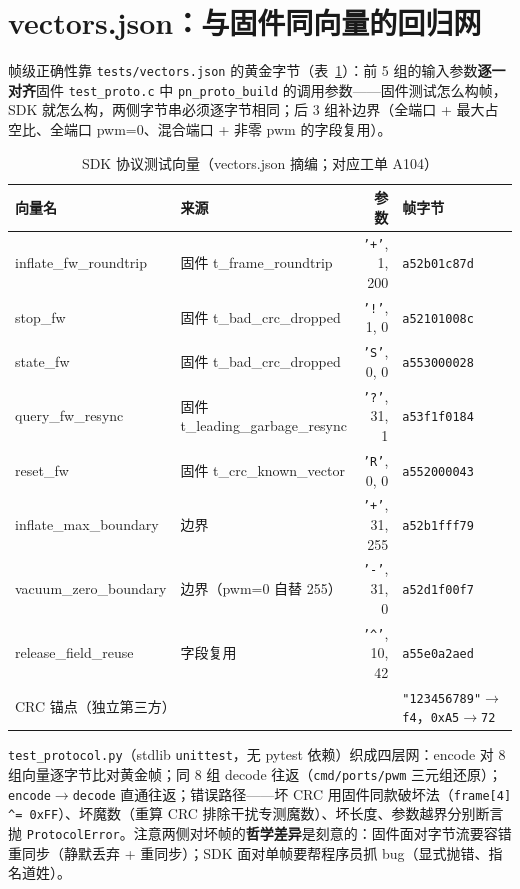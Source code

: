 \section{vectors.json：与固件同向量的回归网}
\label{sec:sdk-vectors}

帧级正确性靠 \texttt{tests/vectors.json} 的黄金字节（表~\ref{tab:sdk-vectors}）：前 5 组的输入参数\textbf{逐一对齐}固件 \texttt{test\_proto.c} 中 \texttt{pn\_proto\_build} 的调用参数——固件测试怎么构帧，SDK 就怎么构，两侧字节串必须逐字节相同；后 3 组补边界（全端口 + 最大占空比、全端口 pwm=0、混合端口 + 非零 pwm 的字段复用）。

\begin{table}[htbp]
  \centering
  \caption{SDK 协议测试向量（vectors.json 摘编；对应工单 A104）}
  \label{tab:sdk-vectors}
  \begin{tabular}{llrl}
    \toprule
    向量名 & 来源 & 参数 & 帧字节 \\
    \midrule
    inflate\_fw\_roundtrip & 固件 t\_frame\_roundtrip & \texttt{'+'}, 1, 200 & \texttt{a52b01c87d} \\
    stop\_fw & 固件 t\_bad\_crc\_dropped & \texttt{'!'}, 1, 0 & \texttt{a52101008c} \\
    state\_fw & 固件 t\_bad\_crc\_dropped & \texttt{'S'}, 0, 0 & \texttt{a553000028} \\
    query\_fw\_resync & 固件 t\_leading\_garbage\_resync & \texttt{'?'}, 31, 1 & \texttt{a53f1f0184} \\
    reset\_fw & 固件 t\_crc\_known\_vector & \texttt{'R'}, 0, 0 & \texttt{a552000043} \\
    inflate\_max\_boundary & 边界 & \texttt{'+'}, 31, 255 & \texttt{a52b1fff79} \\
    vacuum\_zero\_boundary & 边界（pwm=0 自替 255） & \texttt{'-'}, 31, 0 & \texttt{a52d1f00f7} \\
    release\_field\_reuse & 字段复用 & \texttt{'\^{}'}, 10, 42 & \texttt{a55e0a2aed} \\
    \midrule
    \multicolumn{3}{l}{CRC 锚点（独立第三方）} & \texttt{"123456789"}$\to$\texttt{f4}，\texttt{0xA5}$\to$\texttt{72} \\
    \bottomrule
  \end{tabular}
\end{table}

\texttt{test\_protocol.py}（stdlib \texttt{unittest}，无 pytest 依赖）织成四层网：encode 对 8 组向量逐字节比对黄金帧；同 8 组 decode 往返（\texttt{cmd/ports/pwm} 三元组还原）；\texttt{encode$\to$decode} 直通往返；错误路径——坏 CRC 用固件同款破坏法（\texttt{frame[4] \^{}= 0xFF}）、坏魔数（重算 CRC 排除干扰专测魔数）、坏长度、参数越界分别断言抛 \texttt{ProtocolError}。注意两侧对坏帧的\textbf{哲学差异}是刻意的：固件面对字节流要容错重同步（静默丢弃 + 重同步）；SDK 面对单帧要帮程序员抓 bug（显式抛错、指名道姓）。

